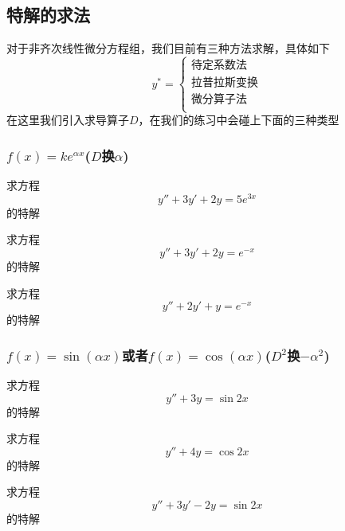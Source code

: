 \documentclass[lang=cn,14pt]{elegantbook}
\begin{document}
	\subsection{特解的求法}
	对于非齐次线性微分方程组，我们目前有三种方法求解，具体如下
	\begin{equation*}
		y^*=\begin{cases}
			\text{待定系数法}\\
			\text{拉普拉斯变换}\\
			\text{微分算子法}\\
		\end{cases}
	\end{equation*}
	在这里我们引入求导算子$D$，在我们的练习中会碰上下面的三种类型
	\subsubsection{$f(x)=ke^{\alpha x}$($D$换$\alpha$)}
		\begin{example}
		求方程
		\begin{equation*}
			y''+3y'+2y=5e^{3x}
		\end{equation*}
		的特解
	\end{example}
	\vspace{2cm}
	\begin{example}
		求方程
		\begin{equation*}
			y''+3y'+2y=e^{-x}
		\end{equation*}
		的特解
	\end{example}
	\vspace{2cm}
	\begin{example}
		求方程
		\begin{equation*}
			y''+2y'+y=e^{-x}
		\end{equation*}
		的特解
	\end{example}
	\vspace{2cm}
	\subsubsection{$f(x)=\sin(\alpha x)$或者$f(x)=\cos(\alpha x)$($D^{2}$换$-\alpha^{2}$)}
	\begin{example}
		求方程
		\begin{equation*}
			y''+3y=\sin 2x
		\end{equation*}
		的特解
	\end{example}
	\vspace{2cm}
	\begin{example}
		求方程
		\begin{equation*}
			y''+4y=\cos 2x
		\end{equation*}
		的特解
	\end{example}
	\vspace{2cm}
		\begin{example}
		求方程
		\begin{equation*}
			y''+3y'-2y=\sin 2x
		\end{equation*}
		的特解
	\end{example}
	\vspace{2cm}
\end{document}
